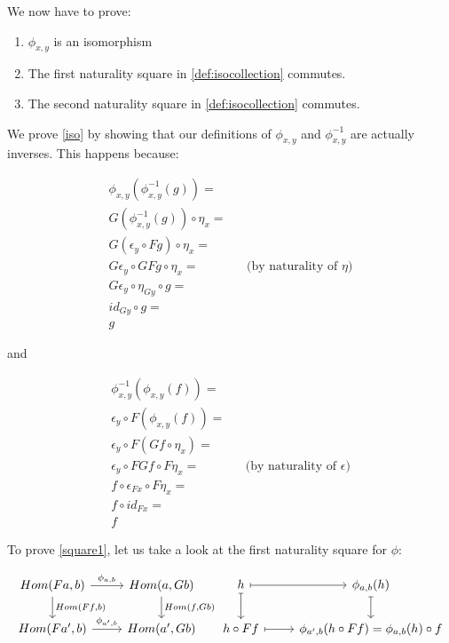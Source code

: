 \documentclass[]{article}
\begin{document}
We now have to prove:
\begin{enumerate}
	\item \label{iso} $\phi_{x,y}$ is an isomorphism
	\item \label{square1} The first naturality square in \cref{def:isocollection} commutes.
	\item \label{square2} The second naturality square in \cref{def:isocollection} commutes.
\end{enumerate}

We prove \cref{iso} by showing that our definitions of $\phi_{x,y}$ and $\phi_{x,y}^{-1}$ are actually inverses. This happens because:

\[
\begin{aligned}
\phi_{x,y} (\phi_{x,y}^{-1}(g)) =
\\ G(\phi_{x,y}^{-1}(g)) \circ \eta_x =
\\ G(\epsilon_y \circ F g) \circ \eta_x =
\\ G\epsilon_y \circ GF g \circ \eta_x = && \text{(by naturality of $\eta$)}
\\ G\epsilon_y \circ \eta_{Gy} \circ g =
\\ id_{Gy} \circ g = 
\\ g
\end{aligned}
\]

and

\[
\begin{aligned}
\phi_{x,y}^{-1}(\phi_{x,y}(f)) =
\\ \epsilon_y \circ F(\phi_{x,y}(f)) =
\\ \epsilon_y \circ F(Gf \circ \eta_x) =
\\ \epsilon_y \circ FGf \circ F\eta_x = && \text{(by naturality of $\epsilon$)}
\\ f \circ \epsilon_{Fx} \circ F\eta_x =
\\ f \circ id_{Fx} =
\\ f
\end{aligned}
\]

\blackqed

To prove \cref{square1}, let us take a look at the first naturality square for $\phi$:

\[
\begin{tikzcd}
Hom(Fa, b) \arrow[r, "\phi_{a,b}"] \arrow[d, "{Hom(Ff,b)}"] & Hom(a, Gb) \arrow[d, "{Hom(f, Gb)}"]
\\ Hom(Fa', b) \arrow[r, "\phi_{a',b}"] & Hom(a', Gb)
\end{tikzcd}
\begin{tikzcd}
h \arrow[r, maps to] \arrow[d, maps to] & \phi_{a,b}(h) \arrow[d, maps to]
\\ h \circ Ff \arrow[r, maps to] & \phi_{a',b}(h \circ Ff) = \phi_{a,b}(h) \circ f
\end{tikzcd}
\]
\end{document}

